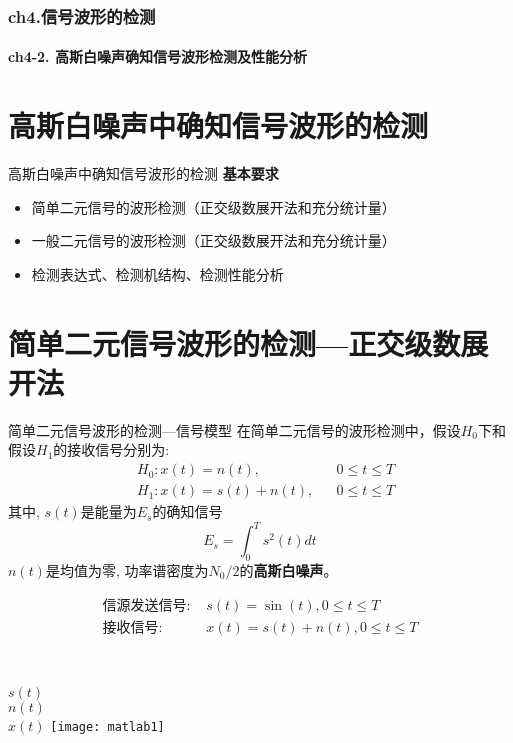 \begin{frame}[shrink]
  \frametitle{ch4.信号波形的检测}
  \framesubtitle{ch4-2. 高斯白噪声确知信号波形检测及性能分析}
  \tableofcontents[hideallsubsections]
\end{frame}

\section{高斯白噪声中确知信号波形的检测}

\begin{frame}{高斯白噪声中确知信号波形的检测}
\textbf{基本要求}
\vspace{0.5cm}
\begin{itemize}
	\setlength{\itemsep}{.5cm}
	\item 简单二元信号的波形检测（正交级数展开法和充分统计量）
	\item 一般二元信号的波形检测（正交级数展开法和充分统计量）
	\item 检测表达式、检测机结构、检测性能分析
\end{itemize}
\end{frame}

\section{简单二元信号波形的检测---正交级数展开法}

\begin{frame}{简单二元信号波形的检测---信号模型}
在简单二元信号的波形检测中，假设$H_0$下和假设$H_1$的接收信号分别为:
\begin{align*}
&H_0: x(t)=n(t), &&0\le t\le T\\
&H_1: x(t)=s(t)+n(t), &&0\le t\le T
\end{align*}
其中, $s(t)$是能量为$E_s$的确知信号
\[E_s=\int_{0}^{T}s^2(t)dt\]
$n(t)$是均值为零, 功率谱密度为$N_0/2$的\textbf{高斯白噪声}。
\end{frame}

\begin{frame}%
\begin{align*}
\text{信源发送信号: } &s(t)=\sin(t),0 \le t\le T\\
\text{接收信号: } &x(t)=s(t)+n(t), 0\le t\le T
\end{align*}
\begin{columns}%
	~\\
	\vspace{0.2cm}
	$s(t)$\\
	\vspace{0.7cm}
	$n(t)$\\
	\vspace{0.7cm}
	$x(t)$
	\texttt{[image: matlab1]}
\end{columns}
\end{frame}

